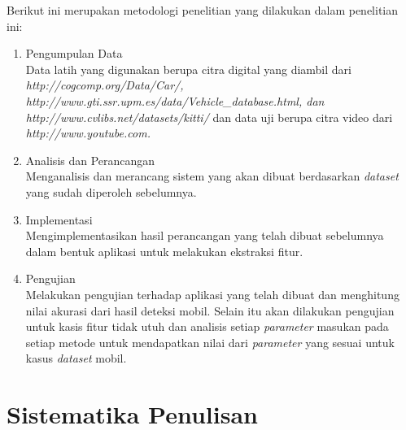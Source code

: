 Berikut ini merupakan metodologi penelitian yang dilakukan dalam penelitian ini: 
\begin{enumerate}[nolistsep,leftmargin=0.5cm]
	
	\item
	Pengumpulan Data \\
	Data latih yang digunakan berupa citra digital yang diambil dari \textit{http://cogcomp.org/Data/Car/, http://www.gti.ssr.upm.es/data/Vehicle\_database.html, dan http://www.cvlibs.net/datasets/kitti/} dan data uji berupa citra video dari \textit{http://www.youtube.com.}
	
	\item
	Analisis dan Perancangan \\
	Menganalisis dan merancang sistem yang akan dibuat berdasarkan \textit{dataset} yang sudah diperoleh sebelumnya.
	
	\item
	Implementasi \\
	Mengimplementasikan hasil perancangan yang telah dibuat sebelumnya dalam bentuk aplikasi untuk melakukan ekstraksi fitur.
	
	\item
	Pengujian \\
	Melakukan pengujian terhadap aplikasi yang telah dibuat dan menghitung nilai akurasi dari hasil deteksi mobil. Selain itu akan dilakukan pengujian untuk kasis fitur tidak utuh dan analisis setiap \textit{parameter} masukan pada setiap metode untuk mendapatkan nilai dari \textit{parameter} yang sesuai untuk kasus \textit{dataset} mobil.
	\\
\end{enumerate}

\section{Sistematika Penulisan}

